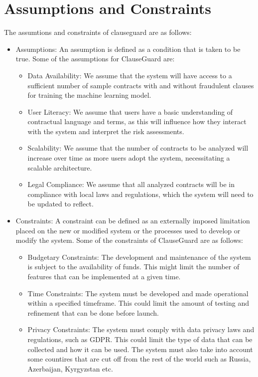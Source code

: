 \section{ Assumptions and Constraints \label{Section::Assumptions and Constraints}}
The assumtions and constraints of clauseguard are as follows:
\begin{itemize}
    \item Assumptions: An assumption is defined as a condition that is taken to be true. Some of the assumptions for ClauseGuard are: 
    \begin{itemize}
        \item Data Availability: We assume that the system will have access to a sufficient number of sample contracts with and without fraudulent clauses for training the machine learning model.
        \item User Literacy: We assume that users have a basic understanding of contractual language and terms, as this will influence how they interact with the system and interpret the risk assessments.
        \item Scalability: We assume that the number of contracts to be analyzed will increase over time as more users adopt the system, necessitating a scalable architecture.
        \item Legal Compliance: We assume that all analyzed contracts will be in compliance with local laws and regulations, which the system will need to be updated to reflect.






    \end{itemize}
    \item Constraints: A constraint can be defined as an externally imposed limitation placed on the new or modified system or the processes used to develop
or modify the system. Some of the constraints of ClauseGuard are as follows: 
\begin{itemize}
    \item Budgetary Constraints: The development and maintenance of the system is subject to the availability of funds. This might limit the number of features that can be implemented at a given time.
    \item Time Constraints: The system must be developed and made operational within a specified timeframe. This could limit the amount of testing and refinement that can be done before launch.
    \item Privacy Constraints: The system must comply with data privacy laws and regulations, such as GDPR. This could limit the type of data that can be collected and how it can be used. The system must also take into account some countires that are cut off from the rest of the world such as Russia, Azerbaijan, Kyrgyzstan etc. 


\end{itemize}
\end{itemize}

